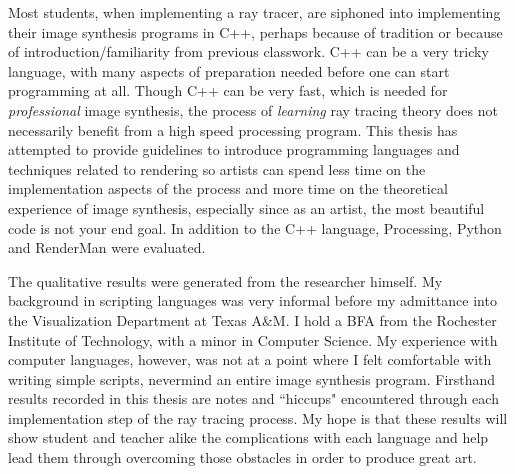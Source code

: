 Most students, when implementing a ray tracer, are siphoned into implementing their image synthesis programs in C++, perhaps because of tradition or because of introduction/familiarity from previous classwork.  C++ can be a very tricky language, with many aspects of preparation needed before one can start programming at all.  Though C++ can be very fast, which is needed for \textit{professional} image synthesis, the process of \textit{learning} ray tracing theory does not necessarily benefit from a high speed processing program.  This thesis has attempted to provide guidelines to introduce programming languages and techniques related to rendering so artists can spend less time on the implementation aspects of the process and more time on the theoretical experience of image synthesis, especially since as an artist, the most beautiful code is not your end goal.  In addition to the C++ language, Processing, Python and RenderMan were evaluated.

The qualitative results were generated from the researcher himself.  My background in scripting languages was very informal before my admittance into the Visualization Department at Texas A\&M.  I hold a BFA from the Rochester Institute of Technology, with a minor in Computer Science.  My experience with computer languages, however, was not at a point where I felt comfortable with writing simple scripts, nevermind an entire image synthesis program.  Firsthand results recorded in this thesis are notes and ``hiccups" encountered through each implementation step of the ray tracing process.  My hope is that these results will show student and teacher alike the complications with each language and help lead them through overcoming those obstacles in order to produce great art.
